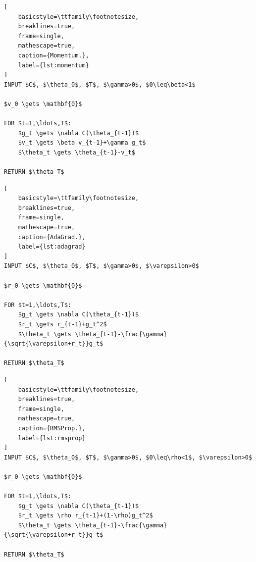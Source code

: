 \documentclass[aps,rmp,reprint,raggedbottom,amsmath,amssymb,longbibliography]{revtex4-1}
\begin{document}
\noindent\begin{minipage}{\linewidth}
\begin{lstlisting}[
    basicstyle=\ttfamily\footnotesize,
    breaklines=true,
    frame=single,
    mathescape=true,
    caption={Momentum.},
    label={lst:momentum}
]
INPUT $C$, $\theta_0$, $T$, $\gamma>0$, $0\leq\beta<1$

$v_0 \gets \mathbf{0}$

FOR $t=1,\ldots,T$:
    $g_t \gets \nabla C(\theta_{t-1})$
    $v_t \gets \beta v_{t-1}+\gamma g_t$
    $\theta_t \gets \theta_{t-1}-v_t$

RETURN $\theta_T$
\end{lstlisting}
\end{minipage}
\noindent\begin{minipage}{\linewidth}
\begin{lstlisting}[
    basicstyle=\ttfamily\footnotesize,
    breaklines=true,
    frame=single,
    mathescape=true,
    caption={AdaGrad.},
    label={lst:adagrad}
]
INPUT $C$, $\theta_0$, $T$, $\gamma>0$, $\varepsilon>0$

$r_0 \gets \mathbf{0}$

FOR $t=1,\ldots,T$:
    $g_t \gets \nabla C(\theta_{t-1})$
    $r_t \gets r_{t-1}+g_t^2$
    $\theta_t \gets \theta_{t-1}-\frac{\gamma}{\sqrt{\varepsilon+r_t}}g_t$

RETURN $\theta_T$
\end{lstlisting}
\end{minipage}
\noindent\begin{minipage}{\linewidth}
\begin{lstlisting}[
    basicstyle=\ttfamily\footnotesize,
    breaklines=true,
    frame=single,
    mathescape=true,
    caption={RMSProp.},
    label={lst:rmsprop}
]
INPUT $C$, $\theta_0$, $T$, $\gamma>0$, $0\leq\rho<1$, $\varepsilon>0$

$r_0 \gets \mathbf{0}$

FOR $t=1,\ldots,T$:
    $g_t \gets \nabla C(\theta_{t-1})$
    $r_t \gets \rho r_{t-1}+(1-\rho)g_t^2$
    $\theta_t \gets \theta_{t-1}-\frac{\gamma}{\sqrt{\varepsilon+r_t}}g_t$

RETURN $\theta_T$
\end{lstlisting}
\end{minipage}
\end{document}
